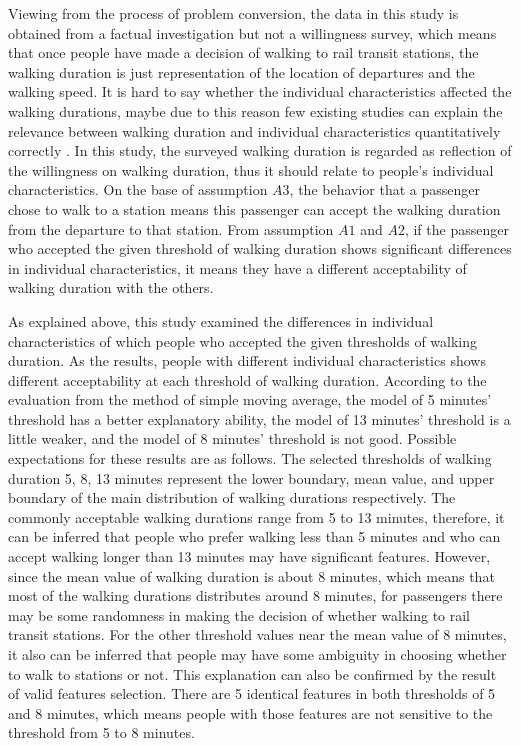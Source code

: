 \documentclass[sustainability,article,submit,moreauthors,pdftex,10pt,a4paper]{Definitions/mdpi}
\begin{document}
% 
Viewing from the process of problem conversion, the data in this study is obtained from a factual investigation but not a willingness survey, which means that once people have made a decision of walking to rail transit stations, the walking duration is just representation of the location of departures and the walking speed. It is hard to say whether the individual characteristics affected the walking durations, maybe due to this reason few existing studies can explain the relevance between walking duration and individual characteristics quantitatively correctly \cite{krygsman2004multimodal,levtnson1997density,daniels2013explaining}. In this study, the surveyed walking duration is regarded as reflection of the willingness on walking duration, thus it should relate to people's individual characteristics. On the base of assumption $A3$, the behavior that a passenger chose to walk to a station means this passenger can accept the walking duration from the departure to that station. From assumption $A1$ and $A2$, if the passenger who accepted the given threshold of walking duration shows significant differences in individual characteristics, it means they have a different acceptability of walking duration with the others.

%
As explained above, this study examined the differences in individual characteristics of which people who accepted the given thresholds of walking duration. As the results, people with different individual characteristics shows different acceptability at each threshold of walking duration. According to the evaluation from the method of simple moving average, the model of 5 minutes’ threshold has a better explanatory ability, the model of 13 minutes' threshold is a little weaker, and the model of 8 minutes' threshold is not good. Possible expectations for these results are as follows. The selected thresholds of walking duration 5, 8, 13 minutes represent the lower boundary, mean value, and upper boundary of the main distribution of walking durations respectively. The commonly acceptable walking durations range from 5 to 13 minutes, therefore, it can be inferred that people who prefer walking less than 5 minutes and who can accept walking longer than 13 minutes may have significant features. However, since the mean value of walking duration is about 8 minutes, which means that most of the walking durations distributes around 8 minutes, for passengers there may be some randomness in making the decision of whether walking to rail transit stations. For the other threshold values near the mean value of 8 minutes, it also can be inferred that people may have some ambiguity in choosing whether to walk to stations or not. This explanation can also be confirmed by the result of valid features selection. There are 5 identical features in both thresholds of 5 and 8 minutes, which means people with those features are not sensitive to the threshold from 5 to 8 minutes.
\end{document}
